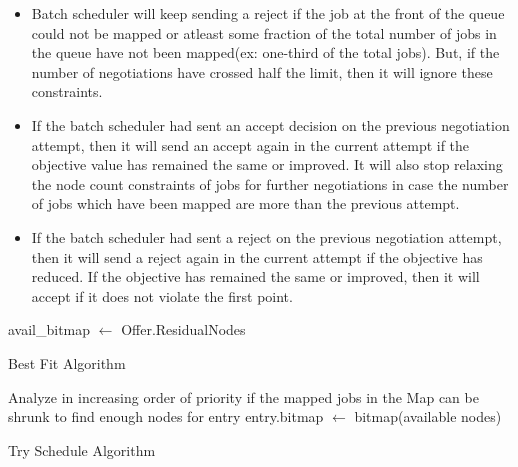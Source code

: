 \begin{itemize}
\item Batch scheduler will keep sending a reject if the job at the front of the queue could not be mapped or atleast some fraction of the total number of jobs in the queue have not been mapped(ex: one-third of the total jobs). But, if the number of negotiations have crossed half the limit, then it will ignore these constraints.
\item If the batch scheduler had sent an accept decision on the previous negotiation attempt, then it will send an accept again in the current attempt if the objective value has remained the same or improved. It will also stop relaxing the node count constraints of jobs for further negotiations in case the number of jobs which have been mapped are more than the previous attempt.
\item If the batch scheduler had sent a reject on the previous negotiation attempt, then it will send a reject again in the current attempt if the objective has reduced. If the objective has remained the same or improved, then it will accept if it does not violate the first point.
\end{itemize}
\setcounter{AlgoLine}{0}
\begin{algorithm}[!htbp]
 \DontPrintSemicolon
 avail\_bitmap $\leftarrow$ Offer.ResidualNodes\;
 \caption{Best Fit Algorithm}
\end{algorithm}
\setcounter{AlgoLine}{0}
\begin{algorithm}[!htbp]
 \DontPrintSemicolon
 Analyze in increasing order of priority if the mapped jobs in the Map can be shrunk to find enough nodes for entry\;
 entry.bitmap $\leftarrow$ bitmap(available nodes)\;
 \caption{Try Schedule Algorithm}
\end{algorithm}
\setcounter{AlgoLine}{0}
